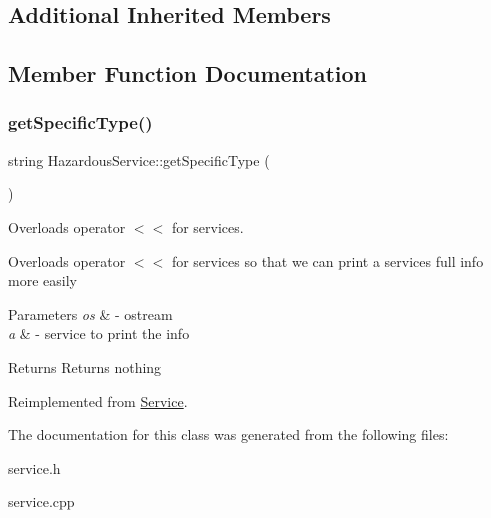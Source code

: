 \subsection*{Additional Inherited Members}


\subsection{Member Function Documentation}
\mbox{\label{class_hazardous_service_a683cc101557a61d0ac6c36cbe67bf6c2}} 
\subsubsection{\texorpdfstring{get\+Specific\+Type()}{getSpecificType()}}
{\footnotesize\ttfamily string Hazardous\+Service\+::get\+Specific\+Type (\begin{DoxyParamCaption}{ }\end{DoxyParamCaption})\hspace{0.3cm}{\ttfamily [virtual]}}



Overloads operator $<$$<$ for services. 

Overloads operator $<$$<$ for services so that we can print a service\textquotesingle{}s full info more easily


\begin{DoxyParams}{Parameters}
{\em os} & -\/ ostream \\
\hline
{\em a} & -\/ service to \textquotesingle{}print\textquotesingle{} the info \\
\hline
\end{DoxyParams}
\begin{DoxyReturn}{Returns}
Returns nothing 
\end{DoxyReturn}


Reimplemented from \hyperlink{class_service_a4e833f8d8688facfe0858eb4299660e8}{Service}.



The documentation for this class was generated from the following files\+:\begin{DoxyCompactItemize}
\item 
service.\+h\item 
service.\+cpp\end{DoxyCompactItemize}
